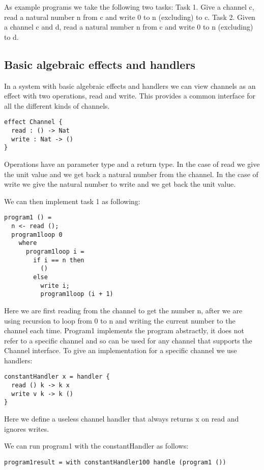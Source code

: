 \documentclass[12pt]{article}
\begin{document}
As example programs we take the following two tasks:
Task 1. Give a channel c, read a natural number n from c and write 0 to n (excluding) to c.
Task 2. Given a channel c and d, read a natural number n from c and write 0 to n (excluding) to d. 

\subsection{Basic algebraic effects and handlers}

In a system with basic algebraic effects and handlers we can view channels as an effect with two operations, read and write.
This provides a common interface for all the different kinds of channels.

\begin{verbatim}
effect Channel {
  read : () -> Nat
  write : Nat -> ()
}
\end{verbatim}

Operations have an parameter type and a return type.
In the case of read we give the unit value and we get back a natural number from the channel.
In the case of write we give the natural number to write and we get back the unit value.

We can then implement task 1 as following:

\begin{verbatim}
program1 () =
  n <- read ();
  program1loop 0
    where
      program1loop i =
        if i == n then
          ()
        else
          write i;
          program1loop (i + 1)
\end{verbatim}

Here we are first reading from the channel to get the number n, after we are using recursion to loop from 0 to n and writing the current number to the channel each time.
Program1 implements the program abstractly, it does not refer to a specific channel and so can be used for any channel that supports the Channel interface.
To give an implementation for a specific channel we use handlers:

\begin{verbatim}
constantHandler x = handler {
  read () k -> k x
  write v k -> k ()
}
\end{verbatim}

Here we define a useless channel handler that always returns x on read and ignores writes.

We can run program1 with the constantHandler as follows:

\begin{verbatim}
program1result = with constantHandler100 handle (program1 ())
\end{verbatim}
\end{document}
